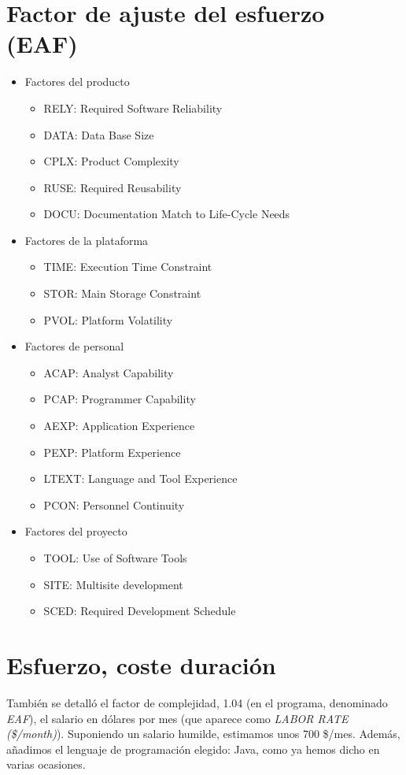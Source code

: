 \documentclass[spanish,a4paper,11pt, twoside]{report}	%
\begin{document}
\section{Factor de ajuste del esfuerzo (EAF)}
\begin {itemize}
	\item{Factores del producto}
		\begin{itemize}
			\item{RELY: Required Software Reliability}
			\item{DATA: Data Base Size}
			\item{CPLX: Product Complexity}
			\item{RUSE: Required Reusability}
			\item{DOCU: Documentation Match to Life-Cycle Needs}
		\end{itemize}
	\item{Factores de la plataforma}
		\begin{itemize}
			\item{TIME: Execution Time Constraint}
			\item{STOR: Main Storage Constraint}
			\item{PVOL: Platform Volatility}
		\end{itemize}
	\item{Factores de personal}
		\begin{itemize}
			\item{ACAP: Analyst Capability}
			\item{PCAP: Programmer Capability}
			\item{AEXP: Application Experience}
			\item{PEXP: Platform Experience}
			\item{LTEXT: Language and Tool Experience}
			\item{PCON: Personnel Continuity}
		\end{itemize}
	\item{Factores del proyecto}
		\begin{itemize}
			\item{TOOL: Use of Software Tools}
			\item{SITE: Multisite development}
			\item{SCED: Required Development Schedule} %
		\end{itemize}
\end{itemize}

\section{Esfuerzo, coste  duración}
También se detalló el factor de complejidad, 1.04 (en el programa, denominado \textit{EAF}), el salario en dólares por mes (que aparece como \textit{LABOR RATE (\$/month)}). Suponiendo un salario humilde, estimamos unos 700 \$/mes. Además, añadimos el lenguaje de programación elegido: Java, como ya hemos dicho en varias ocasiones. 
\end{document}
